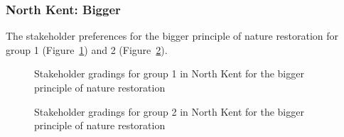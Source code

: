 \documentclass[
  12pt,
  letterpaper,
  DIV=11,
  numbers=noendperiod]{scrartcl}
\begin{document}
\newpage{}

\subsubsection{North Kent: Bigger}\label{north-kent-bigger}

The stakeholder preferences for the bigger principle of nature
restoration for group 1 (Figure~\ref{fig-NKBigG1}) and 2
(Figure~\ref{fig-NKBigG2}).

\begin{figure}[H]


\caption{\label{fig-NKBigG1}Stakeholder gradings for group 1 in North
Kent for the bigger principle of nature restoration}

\end{figure}%

\begin{figure}[H]


\caption{\label{fig-NKBigG2}Stakeholder gradings for group 2 in North
Kent for the bigger principle of nature restoration}

\end{figure}%
\end{document}
